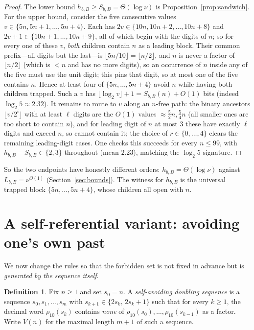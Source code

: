 \documentclass[11pt]{article}
\theoremstyle{plain}
\theoremstyle{definition}
\newtheorem{definition}{Definition}
\theoremstyle{remark}
\newcommand{\Lbb}{L_{b,B}}
\newcommand{\Sbb}{S_{b,B}}
\newcommand{\hbb}{h_{b,B}}
\begin{document}
\begin{proof}
The lower bound $\hbb\ge\Sbb=\Theta(\log\nu)$ is Proposition~\ref{prop:sandwich}. For the upper bound, consider the five consecutive values $v\in\{5n,5n+1,\dots,5n+4\}$. Each has $2v\in\{10n,10n+2,\dots,10n+8\}$ and $2v+1\in\{10n+1,\dots,10n+9\}$, all of which begin with the digits of $n$; so for every one of these $v$, \emph{both} children contain $n$ as a leading block. Their common prefix---all digits but the last---is $\lfloor 5n/10\rfloor=\lfloor n/2\rfloor$, and $n$ is never a factor of $\lfloor n/2\rfloor$ (which is $<n$ and has no more digits), so an occurrence of $n$ inside any of the five must use the unit digit; this pins that digit, so at most one of the five contains $n$. Hence at least four of $\{5n,\dots,5n+4\}$ avoid $n$ while having both children trapped. Such a $v$ has $\lfloor\log_2 v\rfloor+1=\Sbb(n)+O(1)$ bits (indeed $\log_2 5\approx2.32$). It remains to route to $v$ along an $n$-free path: the binary ancestors $\lfloor v/2^{i}\rfloor$ with at least $\ell$ digits are the $O(1)$ values $\approx\tfrac52n,\tfrac54n$ (all smaller ones are too short to contain $n$), and for leading digit of $n$ at most $3$ these have exactly $\ell$ digits and exceed $n$, so cannot contain it; the choice of $r\in\{0,\dots,4\}$ clears the remaining leading-digit cases. One checks this succeeds for every $n\le99$, with $\hbb-\Sbb\in\{2,3\}$ throughout (mean $2.23$), matching the $\log_2 5$ signature.
\end{proof}

So the two endpoints have honestly different orders: $\hbb=\Theta(\log\nu)$ against $\Lbb=\nu^{\Theta(1)}$ (Section~\ref{sec:bounds}). The witness for $\hbb$ is the universal trapped block $\{5n,\dots,5n+4\}$, whose children all open with $n$.

\section{A self-referential variant: avoiding one's own past}\label{sec:variant}

We now change the rules so that the forbidden set is not fixed in advance but is \emph{generated by the sequence itself}.

\begin{definition}
Fix $n\ge 1$ and set $s_0=n$. A \emph{self-avoiding doubling sequence} is a sequence $s_0,s_1,\dots,s_{m}$ with $s_{k+1}\in\{2s_k,\,2s_k+1\}$ such that for every $k\ge 1$, the decimal word $\rho_{10}(s_k)$ contains \emph{none} of $\rho_{10}(s_0),\dots,\rho_{10}(s_{k-1})$ as a factor. Write $V(n)$ for the maximal length $m+1$ of such a sequence.
\end{definition}
\end{document}
